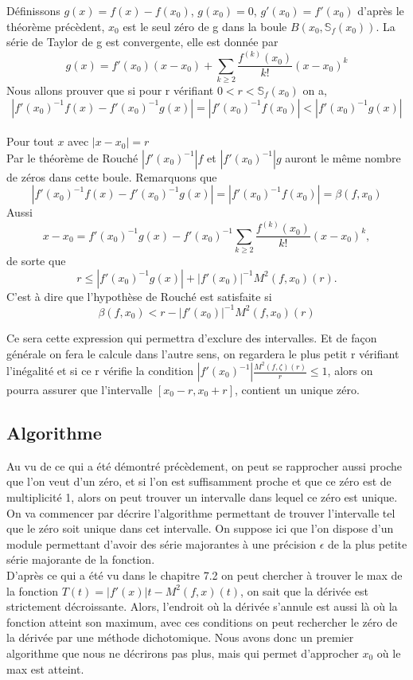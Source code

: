 \documentclass[a4paper,10.5pt]{article}
\begin{document}
	 \vspace{7mm}	
	 
	
	\begin{demonstration}
	
	Définissons $g(x)=f(x)-f(x_0)$, $g(x_0)=0$, $g'(x_0)=f'(x_0)$ d'après le théorème précèdent, $x_0$ est le seul zéro de g dans la boule
	$B(x_0,\mathbb{S}_{f}(x_0))$. La série de Taylor de g est convergente, elle est donnée par
	\[g(x)=f'(x_0)(x-x_0)+ \sum_{k \geq 2}\frac{f^{(k)}(x_0)}{k!}(x-x_0)^k\]
	Nous allons prouver que si pour r vérifiant $0<r<\mathbb{S}_{f}(x_0)$ on a,
	\[|f'(x_0)^{-1}f(x)-f'(x_0)^{-1}g(x)|=|f'(x_0)^{-1}f(x_0)|<|f'(x_0)^{-1}g(x)|\]
	\\
	Pour tout $x$ avec $|x-x_0|=r$
	\\
	Par le théorème de Rouché $|f'(x_0)^{-1}|f$ et $|f'(x_0)^{-1}|g$ auront le même nombre de zéros dans cette boule. Remarquons que 
	\[|f'(x_0)^{-1}f(x)-f'(x_0)^{-1}g(x)|=|f'(x_0)^{-1}f(x_0)|=\beta(f,x_0)\]
	Aussi
	\[x-x_0=f'(x_0)^{-1}g(x)-f'(x_0)^{-1}\sum_{k \geq 2}\frac{f^{(k)}(x_0)}{k!}(x-x_0)^k,\]
	de sorte que
	\[r \leq |f'(x_0)^{-1}g(x)|+|f'(x_0)|^{-1}M^{2}(f,x_0)(r) .\]
	C'est à dire que l'hypothèse de Rouché est satisfaite si
	\[\beta(f,x_0)<r-|f'(x_0)|^{-1}M^{2}(f,x_0)(r)\] 
	
	\end{demonstration}
	Ce sera cette expression qui permettra d'exclure des intervalles. Et de façon générale on fera le calcule dans l'autre sens, on regardera le plus petit r vérifiant l'inégalité et si ce r vérifie la condition $|f'(x_0)^{-1}|\frac{M^{2}(f,\zeta)(r)}{r}\leq 1$, alors on pourra assurer que l'intervalle $[x_0-r,x_0+r]$, contient un unique zéro.
	
	\subsection{Algorithme}
	
	Au vu de ce qui a été démontré précèdement, on peut se rapprocher aussi proche que l'on veut d'un zéro, et si l'on est suffisamment proche et que ce zéro est de multiplicité 1, alors on peut trouver un intervalle dans lequel ce zéro est unique.
	On va commencer par décrire l'algorithme permettant de trouver l'intervalle tel que le zéro soit unique dans cet intervalle.
	On suppose ici que l'on dispose d'un module permettant d'avoir des série majorantes à une précision $\epsilon$ de la plus petite série majorante de la fonction.\\
	D'après ce qui a été vu dans le chapitre 7.2 on peut chercher à trouver le max de la  fonction $T(t)=|f'(x)|t-M^2(f,x)(t)$, on sait que la dérivée est strictement décroissante. Alors, l'endroit où la dérivée s'annule est aussi là où la fonction atteint son maximum, avec ces conditions on peut rechercher le zéro de la dérivée par une méthode dichotomique. Nous avons donc un premier algorithme que nous ne décrirons pas plus, mais qui permet d'approcher $x_0$ où le max est atteint.
	
\end{document}
